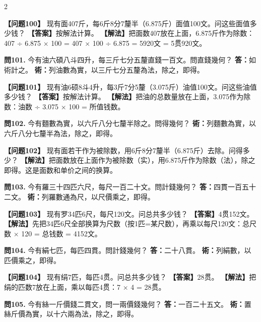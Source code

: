 \documentclass[11pt,a4paper]{article}
\begin{document}
\begin{paracol}{2}
\switchcolumn

\textbf{【问题100】} 现有面407斤，每6斤8分7釐半（6.875斤）面值100文。问这些面值多少钱？\break
\textbf{【答案】}按解法计算。\break
\textbf{【解法】}把面数407放在上面，6.875斤作为除数：407 ÷ 6.875 × 100 = 407 × 100 ÷ 6.875 = 5920文 = 5贯920文。

\switchcolumn*

\textbf{問101.} 今有油六碩八斗四升，每三斤七分五釐直錢一百文。問直錢幾何？\break
\textbf{答：}如術計之。\break
\textbf{術：}列油數為實，以三斤七分五釐為法，除之，即得。

\switchcolumn

\textbf{【问题101】} 现有油6硕8斗4升，每3斤7分5釐（3.075斤）油值100文。问这些油值多少钱？\break
\textbf{【答案】}按解法计算。\break
\textbf{【解法】}把油的总数量放在上面，3.075作为除数：油数 ÷ 3.075 × 100 = 所值钱数。

\switchcolumn*

\textbf{問102.} 今有麵數為實，以六斤八分七釐半除之。問得幾何？\break
\textbf{術：}列麵數為實，以六斤八分七釐半為法，除之，即得。

\switchcolumn

\textbf{【问题102】} 现有面若干作为被除数，用6斤8分7釐半（6.875斤）去除。问得多少？\break
\textbf{【解法】}把面数放在上面作为被除数（实），用6.875斤作为除数（法），除之即得。这是面数和单价之间的换算。

\switchcolumn*

\textbf{問103.} 今有羅三十四匹六尺，每尺一百二十文。問計錢幾何？\break
\textbf{答：}四貫一百五十二文。\break
\textbf{術：}列羅數通為尺，以尺價乘之，即得。

\switchcolumn

\textbf{【问题103】} 现有罗34匹6尺，每尺120文。问总共多少钱？\break
\textbf{【答案】}4贯152文。\break
\textbf{【解法】}先把34匹6尺全部换算为尺数（按1匹=某尺数），再乘以每尺120文：总尺数 × 120 = 总钱数 = 4152文。

\switchcolumn*

\textbf{問104.} 今有絹七匹，每匹四貫。問計錢幾何？\break
\textbf{答：}二十八貫。\break
\textbf{術：}列絹數，以匹價乘之，即得。

\switchcolumn

\textbf{【问题104】} 现有绢7匹，每匹4贯。问总共多少钱？\break
\textbf{【答案】}28贯。\break
\textbf{【解法】}把绢的匹数7放在上面，乘以每匹4贯：7 × 4 = 28贯。

\switchcolumn*

\textbf{問105.} 今有絲一斤價錢二貫文，問一兩價錢幾何？\break
\textbf{答：}一百二十五文。\break
\textbf{術：}置絲斤價為實，以十六兩為法，除之，即得。


\end{paracol}
\end{document}

